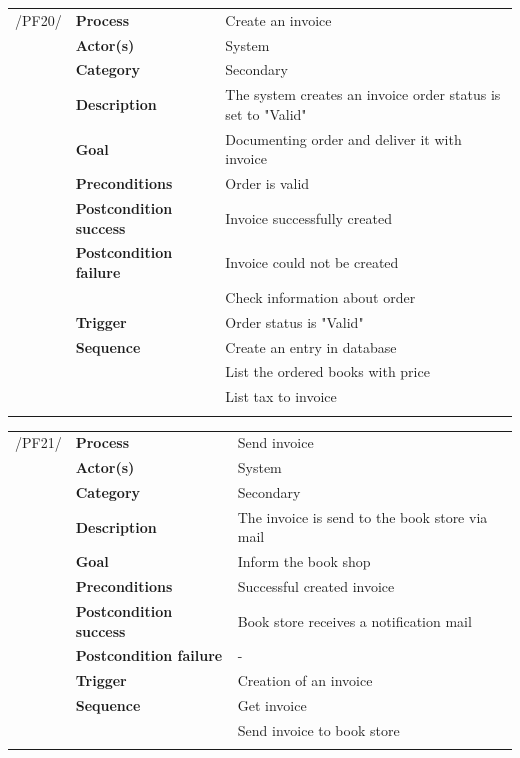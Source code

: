 \documentclass[11pt,a4paper,oneside,svgnames]{report}
\begin{document}
\noindent
\begin{tabular}{p{1.5cm}p{3cm}p{8cm}}
\cellcolor{white}/PF20/	& \textbf{Process} & Create an invoice\\
\cellcolor{white}		& \textbf{Actor(s)} & System\\
\cellcolor{white}		& \textbf{Category} & Secondary\\
\cellcolor{white}		& \textbf{Description}	 & The system creates an invoice order status is set to "Valid"\\
\cellcolor{white}		& \textbf{Goal} & Documenting order and deliver it with invoice\\
\cellcolor{white}		& \textbf{Preconditions} & Order is valid\\
\cellcolor{white}		& \textbf{Postcondition success} & Invoice successfully created\\
\cellcolor{white}		& \textbf{Postcondition failure} & Invoice could not be created\\
\cellcolor{white}		& & Check information about order\\
\cellcolor{white}		& \textbf{Trigger} & Order status is "Valid"\\
\cellcolor{white}		& \textbf{Sequence} & Create an entry in database\\
\cellcolor{white}		& & List the ordered books with price\\
\cellcolor{white}		& & List tax to invoice\\
\cellcolor{white}\hfill \\
\end{tabular}

\noindent
\begin{tabular}{p{1.5cm}p{3cm}p{8cm}}
\cellcolor{white}/PF21/	& \textbf{Process} & Send invoice\\
\cellcolor{white}		& \textbf{Actor(s)} & System\\
\cellcolor{white}		& \textbf{Category} & Secondary\\
\cellcolor{white}		& \textbf{Description}	 & The invoice is send to the book store via mail\\
\cellcolor{white}		& \textbf{Goal} & Inform the book shop\\
\cellcolor{white}		& \textbf{Preconditions} & Successful created invoice\\
\cellcolor{white}		& \textbf{Postcondition success} & Book store receives a notification mail\\
\cellcolor{white}		& \textbf{Postcondition failure} & -\\
\cellcolor{white}		& \textbf{Trigger} & Creation of an invoice\\
\cellcolor{white}		& \textbf{Sequence} & Get invoice\\
\cellcolor{white}		& & Send invoice to book store\\
\cellcolor{white}\hfill \\
\end{tabular}
\end{document}
